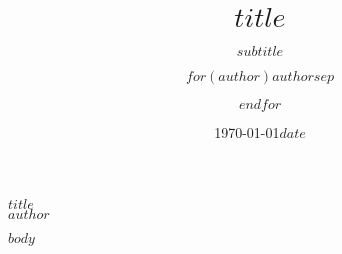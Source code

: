\documentclass[a4paper,oneside,11pt]{article}
\title{$title$}
\subtitle{$subtitle$}
\date{\today}
\date{$date$}
\author{$for(author)$$author$$sep$ \and $endfor$}
\newcommand{\mytitle}{$title$}
\newcommand{\myname} {$author$}
\numberwithin{equation}{section}
\numberwithin{figure}{section}
\numberwithin{table}{section}
\begin{document}
\normalsize
\boldmath
\noindent

\begin{center}
    \Large\textbf{\mytitle}\\
    \large\textit{\myname}\\
    \small{\thedate}
\end{center}


$body$
\end{document}
